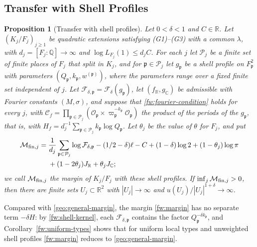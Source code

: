 \documentclass[11pt]{amsart}
\numberwithin{equation}{section}
\newtheorem{proposition}[equation]{Proposition}
\theoremstyle{definition}
\theoremstyle{remark}
\newcommand{\Q}{\mathbb Q}
\newcommand{\R}{\mathbb R}
\newcommand{\C}{\mathbb C}
\begin{document}
\subsection{Transfer with Shell Profiles}

\begin{proposition}[Transfer with shell profiles]\label{fw:transfer}
Let $0<\delta<1$ and $C\in\R$. Let $(K_j/F_j)_{j\ge1}$ be quadratic
extensions satisfying (G1)--(G3) with a common $\lambda$, with
$d_j=[F_j:\Q]\to\infty$ and $\log L_{F_j}(1)\le d_jC$. For each $j$ let
$\mathcal P_j$ be a finite set of finite places of $F_j$ that split in
$K_j$, and for $\mathfrak p\in\mathcal P_j$ let $g_{\mathfrak p}$ be a
shell profile on $F_{\mathfrak p}^2$ with parameters $(Q_{\mathfrak
p},k_{\mathfrak p},w^{(\mathfrak p)})$, where the parameters range over
a fixed finite set independent of $j$. Let $\mathcal F_{\delta,\mathfrak
p}=\mathcal F_\delta(g_{\mathfrak p})$, let $(f_\R,g_\C)$ be admissible
with Fourier constants $(M,\sigma)$, and suppose that
\eqref{fw:fourier-condition} holds for every $j$, with $\mathcal
C_f=\prod_{\mathfrak p\in\mathcal P_j}(\mathcal O_{\mathfrak
p}\times\varpi_{\mathfrak p}^{-k_{\mathfrak p}}\mathcal O_{\mathfrak p})$
the product of the periods of the $g_{\mathfrak p}$, that is, with
$H_f=d_j^{-1}\sum_{\mathfrak p\in\mathcal P_j}k_{\mathfrak p}\log
Q_{\mathfrak p}$. Let $\theta_j$ be the value of $\theta$ for $F_j$, and
put
\begin{equation}\label{fw:margin}
 \begin{split}
 \mathcal M_{{\rm fin},j}={}&
 \frac1{d_j}\sum_{\mathfrak p\in\mathcal P_j}\log\mathcal F_{\delta,\mathfrak p}
 -(1/2-\delta)\ell-C+(1-\delta)\log2+(1-\theta_j)\log\pi\\
 &+(1-2\theta_j)J_\R+\theta_jJ_\C ;
 \end{split}
\end{equation}
we call $\mathcal M_{{\rm fin},j}$ the \emph{margin} of $K_j/F_j$ with
these shell profiles. If $\inf_j\mathcal M_{{\rm fin},j}>0$, then there
are finite sets $U_j\subset\R^2$ with $|U_j|\to\infty$ and
$u(U_j)/|U_j|^{1+\delta}\to\infty$.
\end{proposition}

Compared with \eqref{geo:general-margin}, the margin \eqref{fw:margin}
has no separate term $-\delta H$: by \eqref{fw:shell-kernel}, each
$\mathcal F_{\delta,\mathfrak p}$ contains the factor $Q_{\mathfrak
p}^{-\delta k_{\mathfrak p}}$, and Corollary~\ref{fw:uniform-types}
shows that for uniform local types and unweighted shell profiles
\eqref{fw:margin} reduces to \eqref{geo:general-margin}.
\end{document}
